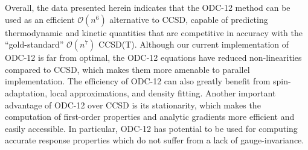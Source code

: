 Overall, the data presented herein indicates that the ODC-12 method can be used
as an efficient $\mathcal{O}(n^6)$ alternative to CCSD, capable of predicting
thermodynamic and kinetic quantities that are competitive in accuracy with the
``gold-standard'' $\mathcal{O}(n^7)$ CCSD(T).
Although our current implementation of ODC-12 is far from optimal, the ODC-12
equations have reduced non-linearities compared to CCSD, which makes them more
amenable to parallel implementation.
The efficiency of ODC-12 can also greatly benefit from
spin-adaptation,\cite{Kutzelnigg:1999p2800,Kutzelnigg:2002p4787,Kutzelnigg:2010p433}
local
approximations,\cite{Werner:2003p8149,Taube:2005p837,Neese:2009p064103,Neese:2009p114108}
and density
fitting.\cite{Vahtras:1993p514,Hetzer:2000p9443,Schutz:2001p661,Werner:2003p8149}
Another important advantage of ODC-12 over CCSD is its stationarity, which makes
the computation of first-order properties and analytic gradients more efficient
and easily accessible.
In particular, ODC-12 has potential to be used for computing accurate response
properties which do not suffer from a lack of
gauge-invariance.\cite{Pedersen:1999p8318,Pedersen:2001p6983}
